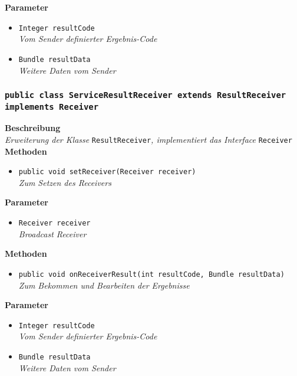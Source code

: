 	\textbf{Parameter}
	\begin{itemize}
		\item\texttt{Integer resultCode}\\ 
	\textit{Vom Sender definierter Ergebnis-Code}\\
		\item\texttt{Bundle resultData}\\ 
	\textit{Weitere Daten vom Sender }\\
	\end{itemize}

\subsubsection{\texttt{public class ServiceResultReceiver extends ResultReceiver implements Receiver}}

	\textbf{Beschreibung} \\
	\textit{Erweiterung der Klasse} \texttt{ResultReceiver}\textit{, implementiert das Interface} \texttt{Receiver}\\

	\textbf{Methoden}
	\begin{itemize}
		\item\texttt{{public void setReceiver(Receiver receiver)}}\\
	\textit{Zum Setzen des Receivers}\\
	\end{itemize}
	
	\textbf{Parameter}
	\begin{itemize}
		\item\texttt{Receiver receiver}\\ 
	\textit{Broadcast Receiver}\\
	\end{itemize}
	
	\textbf{Methoden}
	\begin{itemize}
		\item\texttt{{public void onReceiverResult(int resultCode, Bundle resultData)}}\\
	\textit{Zum Bekommen und Bearbeiten der Ergebnisse}\\
	\end{itemize}

	\textbf{Parameter}
	\begin{itemize}
		\item\texttt{Integer resultCode}\\ 
	\textit{Vom Sender definierter Ergebnis-Code}\\
		\item\texttt{Bundle resultData}\\ 
	\textit{Weitere Daten vom Sender }\\
	\end{itemize}

\newpage
